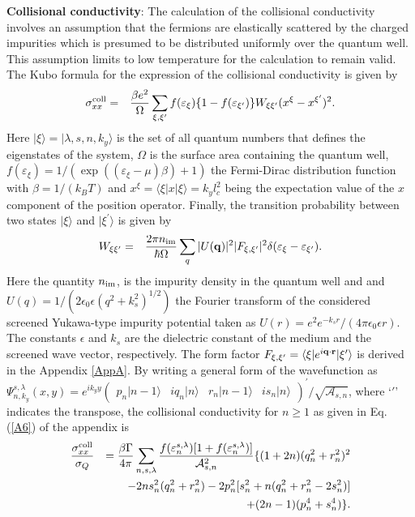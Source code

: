 \documentclass[prb,twocolumn]{revtex4-1}
\begin{document}
{\bf{Collisional conductivity}}: The calculation of the collisional conductivity involves an assumption that the fermions are elastically scattered by the charged impurities which is presumed to be distributed uniformly over the quantum well. This assumption limits to low temperature for the calculation to remain valid. The Kubo formula for the expression of the collisional conductivity is given by \cite{Van, Carol, vasilo, Peet, wang}
\begin{eqnarray}\label{coll}
	\sigma ^{\rm coll}_{xx}&=&\frac{\beta e^2}{\Omega}\sum\limits_{\xi,\xi^\prime}
	f(\varepsilon_\xi)\{1-f(\varepsilon_{\xi^\prime})\} W_{\xi \xi^\prime}(x^{\xi}-x^{\xi^\prime})^2.
\end{eqnarray}
Here $\vert\xi\rangle=\vert \lambda, s, n,k_y\rangle$ is the set of all quantum numbers that defines the eigenstates of the system, $\Omega$ is the surface area containing the quantum well, $f(\varepsilon_\xi)=1/(\exp((\varepsilon_\xi-\mu)\beta)+1)$ the Fermi-Dirac distribution function with $\beta=1/(k_BT)$ and $x^\xi=\langle \xi\vert x\vert\xi\rangle=k_yl_c^2 $ being the expectation value of the $x$ component of the position operator. Finally, the transition probability between two states $\vert\xi\rangle$ and $\vert\xi^\prime\rangle$ is given by
\begin{eqnarray}\label{trans_prob}
	W_{\xi \xi^{\prime}}&=&\frac{2\pi n_{\rm im}}{\hbar\Omega }
	\sum\limits_{q}\vert U({\bf q})\vert^2\vert F_{\xi,\xi^\prime}\vert^2
	\delta (\varepsilon_{\xi}-\varepsilon_{\xi^\prime}).
\end{eqnarray}
Here the quantity $n_{\rm im}$, is the impurity density in the quantum well and and 	$U(q)=1/(2\epsilon_0 \epsilon(q^2+k^2_s)^{1/2})$ the Fourier transform of the considered screened Yukawa-type impurity potential taken as	$ U(r)=e^2e^{-k_sr}/(4\pi\epsilon_0 \epsilon r)$.  The constants $\epsilon$ and $k_s$ are the dielectric constant of the medium and the screened wave vector, respectively. The form factor $F_{\xi,\xi^\prime}=\langle{\xi}\vert e^{i{\bf q} \cdot{\bf r}}\vert{\xi^\prime}\rangle$ is derived in the Appendix \ref{AppA}.	By writing a general form of the wavefunction as $\Psi_{n,k_y}^{s,\lambda}(x,y)=e^{ik_yy}\begin{pmatrix}
p_n\vert n-1\rangle&iq_n\vert n\rangle& r_n\vert n-1\rangle&is_n\vert n\rangle
\end{pmatrix}^\prime/\sqrt{\mathcal{A}_{s,n}}$, where `$\prime$' indicates the transpose, the collisional conductivity for $n\ge 1$ as given in Eq. (\ref{A6}) of the appendix is
\begin{eqnarray}\label{coll1}
	\frac{\sigma_{xx}^{\rm coll}}{\sigma_Q}&&=\frac{\beta \Gamma}{4\pi}\sum_{n,s,\lambda}\frac{f(\varepsilon_n^{s,\lambda})[1+f(\varepsilon_n^{s,\lambda})]}{\mathcal{A}_{s,n}^2}\{(1+2n)(q_n^2+r_n^2)^2\nonumber\\
	&&-2ns_n^2(q_n^2+r_n^2)-2p_n^2[s_n^2+n(q_n^2+r_n^2-2s_n^2)]\nonumber\\&&+(2n-1)(p_n^4+s_n^4)\}.
\end{eqnarray}
\end{document}
